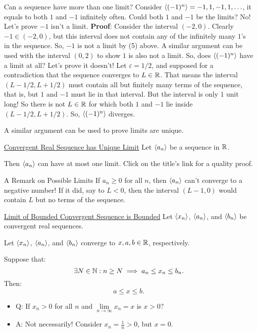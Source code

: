 \begin{Example}{}{}
    Can a sequence have more than one limit?
    Consider $ \langle(-1)^n\rangle=-1,1,-1,1,\ldots $, it equals to both $ 1 $ and $ -1 $ infinitely often. Could both $ 1 $ and $ -1 $
    be the limits? No! Let's prove $ -1 $ isn't a limit.
    \tcblower{}
    \textbf{Proof}: Consider the interval $ (-2,0) $. Clearly $ -1\in(-2,0) $, but
    this interval does not contain any of the infinitely many $ 1 $'s in the sequence. So, $ -1 $
    is not a limit by (5) above. A similar argument can be used with the interval $ (0,2) $ to show
    $ 1 $ is also not a limit. So, does $ \langle(-1)^n\rangle $ have a limit at all? Let's prove it doesn't!
    Let $ \varepsilon=1/2 $, and supposed for a contradiction that the sequence converges to $ L\in\mathbb{R} $. That means
    the interval $ (L-1/2,L+1/2) $ must contain all but finitely many terms of the sequence, that is, but $ 1 $ and $ -1 $
    must lie in that interval. But the interval is only $ 1 $ unit long! So there is not $ L\in\mathbb{R} $ for which both $ 1 $ and $ -1 $
    lie inside $ (L-1/2,L+1/2) $. So, $ \langle(-1)^n\rangle $ diverges.
\end{Example}
A similar argument can be used to prove limits are unique.
\begin{Theorem}{\href{https://proofwiki.org/wiki/Convergent_Real_Sequence_has_Unique_Limit}{Convergent Real Sequence has Unique Limit}}{}
    Let $ \langle a_n\rangle $ be a sequence in $ \mathbb{R} $.\bigskip

    Then $ \langle a_n\rangle $ can have at most one limit.
    \tcblower{}
    Click on the title's link for a quality proof.
\end{Theorem}
\begin{Remark}{A Remark on Possible Limits}{}
    If $ a_n\ge 0 $ for all $ n $, then $ \langle a_n\rangle $ can't converge to a negative number! If it did, say to $ L<0 $,
    then the interval $ (L-1,0) $ would contain $ L $ but no terms of the sequence.
\end{Remark}
\begin{Theorem}{\href{https://proofwiki.org/wiki/Limit_of_Bounded_Convergent_Sequence_is_Bounded}{Limit of Bounded Convergent Sequence is Bounded}}{}
    Let $ \langle x_n\rangle $, $ \langle a_n\rangle $, and $ \langle b_n\rangle $ be convergent real sequences.\smallskip

    Let $ \langle x_n\rangle $, $ \langle a_n\rangle $, and $ \langle b_n\rangle $ converge to $ x,a,b\in\mathbb{R} $, respectively.\bigskip

    Suppose that:
    \[ \exists N\in\mathbb{N}:n\ge N\implies a_n\le x_n\le b_n. \]
    Then:
    \[ a\le x\le b. \]
\end{Theorem}
\begin{itemize}
    \item Q\@: If $ x_n>0 $ for all $ n $ and $ \lim\limits_{{n} \to {\infty}}x_n=x $ is $ x>0 $?
    \item A\@: Not necessarily! Consider $ x_n=\frac{1}{n}>0 $, but $ x=0 $.
\end{itemize}
